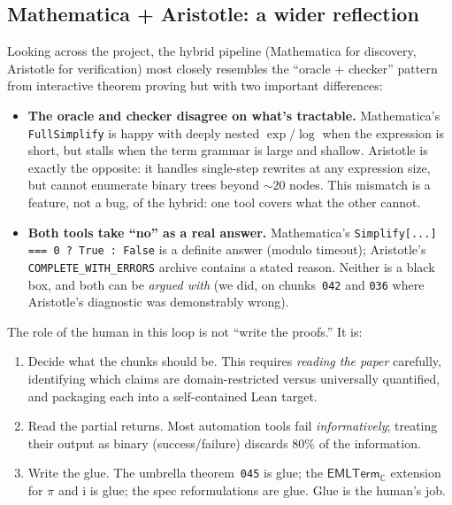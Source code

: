 \documentclass[11pt,a4paper]{article}
\theoremstyle{plain}
\theoremstyle{definition}
\newcommand{\C}{\mathbb{C}}
\newcommand{\imu}{\mathrm{i}}
\newcommand{\EMLTC}{\mathsf{EMLTerm}_\C}
\begin{document}
\subsection{Mathematica + Aristotle: a wider reflection}

Looking across the project, the hybrid pipeline (Mathematica for
discovery, Aristotle for verification) most closely resembles the
``oracle + checker'' pattern from interactive theorem proving but with
two important differences:

\begin{itemize}[leftmargin=*]
\item \textbf{The oracle and checker disagree on what's tractable.}
Mathematica's \texttt{FullSimplify} is happy with deeply nested
$\exp/\log$ when the expression is short, but stalls when the term
grammar is large and shallow.  Aristotle is exactly the opposite: it
handles single-step rewrites at any expression size, but cannot enumerate
binary trees beyond $\sim 20$ nodes.  This mismatch is a feature, not a
bug, of the hybrid: one tool covers what the other cannot.
\item \textbf{Both tools take ``no'' as a real answer.}  Mathematica's
\texttt{Simplify[...] === 0 ? True : False} is a definite answer
(modulo timeout); Aristotle's \texttt{COMPLETE\_WITH\_ERRORS} archive
contains a stated reason.  Neither is a black box, and both can be
\emph{argued with} (we did, on chunks~\texttt{042} and \texttt{036}
where Aristotle's diagnostic was demonstrably wrong).
\end{itemize}

The role of the human in this loop is not ``write the proofs.''  It
is:

\begin{enumerate}[leftmargin=*,nosep]
\item Decide what the chunks should be.  This requires
\emph{reading the paper} carefully, identifying which claims are
domain-restricted versus universally quantified, and packaging each
into a self-contained Lean target.
\item Read the partial returns.  Most automation tools fail
\emph{informatively}; treating their output as binary (success/failure)
discards $80\%$ of the information.
\item Write the glue.  The umbrella theorem~\texttt{045} is glue;
the $\EMLTC$ extension for $\pi$ and $\imu$ is glue; the
spec reformulations are glue.  Glue is the human's job.
\end{enumerate}
\end{document}
